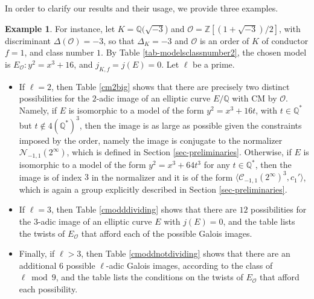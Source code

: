\documentclass[11pt]{amsart}
\theoremstyle{definition}
\newtheorem{example}[defn]{Example}
\newcommand{\Q}{\mathbb Q}
\newcommand{\Z}{\mathbb Z}
\begin{document}
In order to clarify our results and their usage, we provide three examples.

\begin{example}
For instance, let $K=\Q(\sqrt{-3}$) and $\mathcal{O}=\Z[(1+\sqrt{-3})/2]$, with discriminant $\Delta(\mathcal{O})=-3$, so that $\Delta_K=-3$ and $\mathcal{O}$ is an order of $K$ of conductor $f=1$, and class number $1$. By Table \ref{tab-modelsclassnumber2}, the chosen model is $E_\mathcal{O}: y^2=x^3+16$, and $j_{K,f}=j(E)=0$. Let $\ell$ be a prime. 
\begin{itemize}
    \item If $\ell=2$, then Table \ref{cm2big} shows that there are precisely two distinct possibilities for the $2$-adic image of an elliptic curve $E/\Q$ with CM by $\mathcal{O}$. Namely, if $E$ is isomorphic to a model of the form $y^2=x^3+16t$, with $t\in \Q^\ast$ but $t\not\in 4(\Q^\ast)^3$, then the image is as large as possible given the constraints imposed by the order, namely the image is conjugate to the normalizer $\mathcal{N}_{-1,1}(2^\infty)$, which is defined in Section \ref{sec-preliminaries}. Otherwise, if $E$ is isomorphic to a model of the form $y^2=x^3+64t^3$ for any $t\in \Q^\ast$, then the image is of index $3$ in the normalizer and it is of the form $\langle \mathcal{C}_{-1,1}(2^\infty)^3,c_1'\rangle$, which is again a group explicitly described in Section \ref{sec-preliminaries}.

 \item If $\ell=3$, then Table \ref{cmodddividing} shows that there are $12$ possibilities for the $3$-adic image of an elliptic curve $E$ with $j(E)=0$, and the table lists the twists of $E_\mathcal{O}$ that afford each of the possible Galois images.

\item Finally, if $\ell>3$, then Table \ref{cmoddnotdividing} shows that there are an additional $6$ possible $\ell$-adic Galois images, according to the class of $\ell \bmod 9$, and the table lists the conditions on the twists of $E_\mathcal{O}$ that afford each possibility.

   \end{itemize} 
\end{example}
\end{document}
